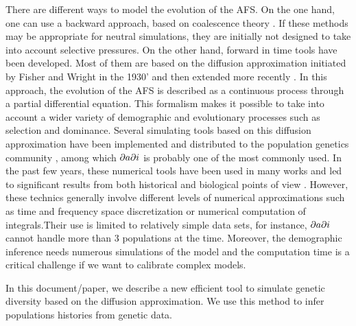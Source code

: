 There are different ways to model the evolution of the AFS. On the one hand, one can use a backward approach, based on coalescence theory \cite{excoffier2011}. If these methods may be appropriate for neutral simulations, they are initially not designed to take into account selective pressures. On the other hand, forward in time tools have been developed. Most of them are based on the diffusion approximation initiated by Fisher and Wright in the 1930' \cite{fisher1930, wright1931} and then extended more recently \cite{crow1970, kimura1964}. In this approach, the evolution of the AFS is described as a continuous process through a partial differential equation. This formalism makes it possible to take into account a wider variety of demographic and evolutionary processes such as selection and dominance. Several simulating tools based on this diffusion approximation have been implemented and distributed to the population genetics community \cite{gutenkunst2009, lukic2012, lukic2011}, among which $\partial a \partial i$ is probably one of the most commonly used. In the past few years, these numerical tools have been used in many works and led to significant results from both historical and biological points of view \cite{gutenkunst2009, gravel2011, schmutz2014}. However, these technics generally involve different levels of numerical approximations such as time and frequency space discretization or numerical computation of integrals.Their use is limited to relatively simple data sets, for instance, $\partial a \partial i$ cannot handle more than 3 populations at the time. Moreover, the demographic inference needs numerous simulations of the model and the computation time is a critical challenge if we want to calibrate complex models.

In this document/paper, we describe a new efficient tool to simulate genetic diversity based on the diffusion approximation. We use this method to infer populations histories from genetic data.